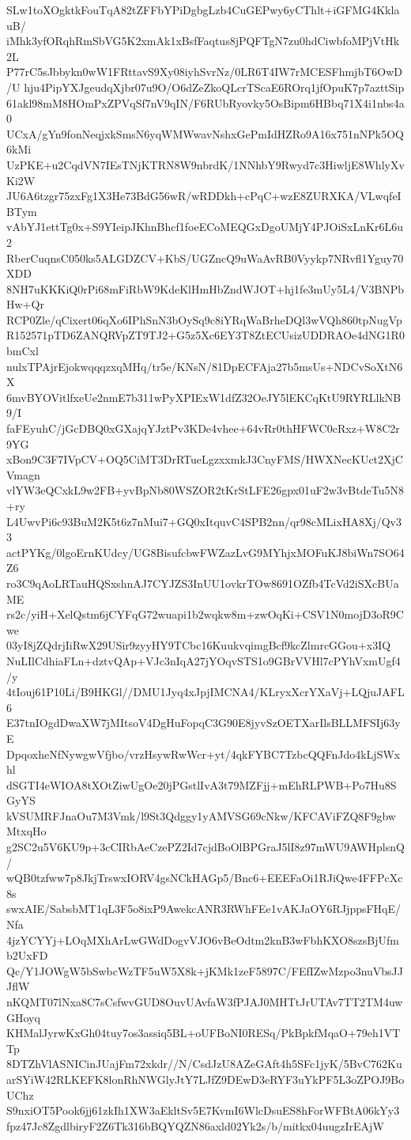 SLw1toXOgktkFouTqA82tZFFbYPiDgbgLzb4CuGEPwy6yCThlt+iGFMG4KklauB/
iMhk3yfORqhRmSbVG5K2xmAk1xBsfFaqtus8jPQFTgN7zu0hdCiwbfoMPjVtHk2L
P77rC5sJbbykn0wW1FRttavS9Xy08iyhSvrNz/0LR6T4IW7rMCESFhmjbT6OwD/U
hju4PipYXJgeudqXjbr07u9O/O6dZeZkoQLcrTScaE6ROrq1jfOpuK7p7azttSip
61akl98mM8HOmPxZPVqSf7nV9qIN/F6RUbRyovky5OsBipm6HBbq71X4i1nbs4a0
UCxA/gYn9fonNeqjxkSmsN6yqWMWwavNshxGePmIdHZRo9A16x751nNPk5OQ6kMi
UzPKE+u2CqdVN7IEsTNjKTRN8W9nbrdK/1NNhbY9Rwyd7c3HiwljE8WhlyXvKi2W
JU6A6tzgr75zxFg1X3He73BdG56wR/wRDDkh+cPqC+wzE8ZURXKA/VLwqfeIBTym
vAbYJ1ettTg0x+S9YIeipJKhnBhcf1foeECoMEQGxDgoUMjY4PJOiSxLnKr6L6u2
RberCuqnsC050ks5ALGDZCV+KbS/UGZncQ9uWaAvRB0Vyykp7NRvfl1Yguy70XDD
8NH7uKKKiQ0rPi68mFiRbW9KdeKlHmHbZndWJOT+hj1fe3mUy5L4/V3BNPbHw+Qr
RCP0Zle/qCixert06qXo6IPhSnN3bOySq9c8iYRqWaBrheDQl3wVQh860tpNugVp
R152571pTD6ZANQRVpZT9TJ2+G5z5Xc6EY3T8ZtECUsizUDDRAOe4dNG1R0bmCxl
nulxTPAjrEjokwqqqzxqMHq/tr5e/KNsN/81DpECFAja27b5msUs+NDCvSoXtN6X
6mvBYOVitlfxeUe2nmE7b311wPyXPIExW1dfZ32OeJY5lEKCqKtU9RYRLlkNB9/I
faFEyuhC/jGcDBQ0xGXajqYJztPv3KDe4vhee+64vRr0thHFWC0cRxz+W8C2r9YG
xBon9C3F7IVpCV+OQ5CiMT3DrRTueLgzxxmkJ3CnyFMS/HWXNecKUct2XjCVmagn
vlYW3eQCxkL9w2FB+yvBpNb80WSZOR2tKrStLFE26gpx01uF2w3vBtdeTu5N8+ry
L4UwvPi6c93BuM2K5t6z7nMui7+GQ0xItquvC4SPB2nn/qr98cMLixHA8Xj/Qv33
actPYKg/0lgoErnKUdcy/UG8BisufcbwFWZazLvG9MYhjxMOFuKJ8biWn7SO64Z6
ro3C9qAoLRTauHQSxshnAJ7CYJZS3InUU1ovkrTOw8691OZfb4TcVd2iSXcBUaME
rs2c/yiH+XelQstm6jCYFqG72wuapi1b2wqkw8m+zwOqKi+CSV1N0mojD3oR9Cwe
03yI8jZQdrjIiRwX29USir9zyyHY9TCbc16KuukvqimgBcf9kcZlmrcGGou+x3IQ
NuLIlCdhiaFLn+dztvQAp+VJc3nIqA27jYOqvSTS1o9GBrVVHl7cPYhVxmUgf4/y
4tIouj61P10Li/B9HKGl//DMU1Jyq4xJpjIMCNA4/KLryxXcrYXaVj+LQjuJAFL6
E37tnIOgdDwaXW7jMItsoV4DgHuFopqC3G90E8jyvSzOETXarIlsBLLMFSIj63yE
DpqoxheNfNywgwVfjbo/vrzHsywRwWcr+yt/4qkFYBC7TzbcQQFnJdo4kLjSWxhl
dSGTI4eWIOA8tXOtZiwUgOe20jPGstlIvA3t79MZFjj+mEhRLPWB+Po7Hu8SGyYS
kVSUMRFJnaOu7M3Vmk/l9St3Qdggy1yAMVSG69cNkw/KFCAViFZQ8F9gbwMtxqHo
g2SC2u5V6KU9p+3cCIRbAeCzePZ2Id7cjdBoOlBPGraJ5lI8z97mWU9AWHplsnQ/
wQB0tzfww7p8JkjTrswxIORV4gsNCkHAGp5/Bnc6+EEEFaOi1RJiQwe4FFPcXc8s
swxAIE/SabsbMT1qL3F5o8ixP9AwekcANR3RWhFEe1vAKJaOY6RJjppsFHqE/Nfa
4jzYCYYj+LOqMXhArLwGWdDogvVJO6vBeOdtm2knB3wFbhKXO8szsBjUfmb2UxFD
Qc/Y1JOWgW5bSwbcWzTF5uW5X8k+jKMk1zeF5897C/FEfIZwMzpo3nuVbsJJJflW
nKQMT07lNxa8C7sCsfwvGUD8OuvUAvfaW3fPJAJ0MHTtJrUTAv7TT2TM4uwGHoyq
KHMalJyrwKxGh04tuy7os3assiq5BL+oUFBoNI0RESq/PkBpkfMqaO+79eh1VTTp
8DTZhVlASNICinJUajFm72xkdr//N/CsdJzU8AZeGAft4h5SFc1jyK/5BvC762Ku
arSYiW42RLKEFK8lonRhNWGlyJtY7LJfZ9DEwD3eRYF3uYkPF5L3oZPOJ9BoUChz
S9nxiOT5Pook6jj61zkIh1XW3aEkltSv5E7KvmI6WlcDsuES8hForWFBtA06kYy3
fpz47Jc8ZgdlbiryF2Z6Tk316bBQYQZN86axld02Yk2s/b/mitkx04uugzIrEAjW
